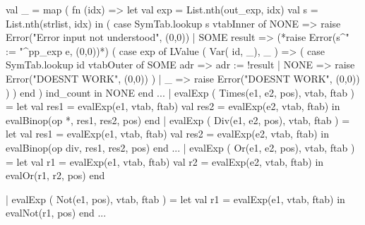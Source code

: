 \documentclass[10pt]{article}
\begin{document}
\begin{fancycode}[frame=lines,fontsize=\scriptsize,label=\textit{edited code - SRC/TpInterpret.sml - }]
   val _ = map ( fn (idx) =>
               let val exp = List.nth(out_exp, idx)
                   val s   = List.nth(strlist, idx)
               in
                  ( case SymTab.lookup s vtabInner of
                    NONE => raise Error("Error input not understood", (0,0))
                  | SOME result =>
                           (*raise Error(s^" := "^pp_exp e, (0,0))*)
                           ( case exp of
                              LValue ( Var( id, _), _ ) =>
                              (
                               case SymTab.lookup id vtabOuter of
                                 SOME adr =>
                                 adr := !result
                               | NONE => raise Error("DOESNT WORK", (0,0))
                              )
                           | _ => raise Error("DOESNT WORK", (0,0))
                           )
                  )
               end
         ) ind_count
in
   NONE
end
...
  | evalExp ( Times(e1, e2, pos), vtab, ftab ) =
        let val res1   = evalExp(e1, vtab, ftab)
            val res2   = evalExp(e2, vtab, ftab)
        in  evalBinop(op *, res1, res2, pos)
        end
  | evalExp ( Div(e1, e2, pos), vtab, ftab ) =
        let val res1   = evalExp(e1, vtab, ftab)
            val res2   = evalExp(e2, vtab, ftab)
        in  evalBinop(op div, res1, res2, pos)
        end
...
  | evalExp ( Or(e1, e2, pos), vtab, ftab ) =
        let val r1 = evalExp(e1, vtab, ftab)
            val r2 = evalExp(e2, vtab, ftab)
	     in  evalOr(r1, r2, pos)
     	  end

  | evalExp ( Not(e1, pos), vtab, ftab ) =
        let val r1 = evalExp(e1, vtab, ftab)
	     in  evalNot(r1, pos)
     	  end
...
\end{fancycode}
\end{document}
